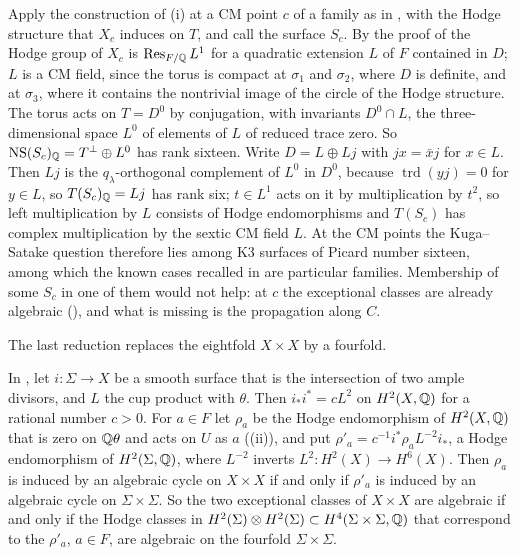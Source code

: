 \begin{remark}\label{rem:mumfordkscm}
Apply the construction of (i) at a CM point $c$ of a
family as in , with the Hodge structure that
$X_{c}$ induces on $T$, and call the surface $S_{c}$. By the proof of
 the Hodge group of $X_{c}$ is $\operatorname{Res}_{F/\mathbb{Q}}L^{1}$ for a
quadratic extension $L$ of $F$ contained in $D$; $L$ is a CM field, since the
torus is compact at $\sigma_{1}$ and $\sigma_{2}$, where $D$ is definite, and
at $\sigma_{3}$, where it contains the nontrivial image of the circle of the
Hodge structure. The torus acts on $T=D^{0}$ by conjugation, with invariants
$D^{0}\cap L$, the three-dimensional space $L^{0}$ of elements of $L$ of
reduced trace zero. So $\mathrm{NS}(S_{c})_{\mathbb{Q}}=T^{\perp}\oplus L^{0}$ has rank
sixteen. Write $D=L\oplus Lj$ with $jx=\bar{x}j$ for $x\in L$. Then $Lj$ is
the $q_{\lambda}$-orthogonal complement of $L^{0}$ in $D^{0}$, because
$\operatorname{trd}(yj)=0$ for $y\in L$, so $T(S_{c})_{\mathbb{Q}}=Lj$ has rank six;
$t\in L^{1}$ acts on it by multiplication by $t^{2}$, so left multiplication
by $L$ consists of Hodge endomorphisms and $T(S_{c})$ has complex
multiplication by the sextic CM field $L$. At the CM points the Kuga--Satake
question therefore lies among K3 surfaces of Picard number sixteen, among
which the known cases recalled in  are particular
families. Membership of some $S_{c}$ in one of them would not help: at $c$ the exceptional classes are already algebraic
(), and what is missing is the propagation along $C$.
\end{remark}

The last reduction replaces the eightfold $X\times X$ by a fourfold.

\begin{proposition}[A surface in $X$]\label{prop:mumfordsurface}
In , let $i\colon\Sigma\to X$ be a smooth surface that is
the intersection of two ample divisors, and $L$ the cup product with
$\theta$. Then $i_{*}i^{*}=cL^{2}$ on $H^{2}(X,\mathbb{Q})$ for a rational number
$c>0$. For $a\in F$ let $\rho_{a}$ be the Hodge endomorphism of
$H^{2}(X,\mathbb{Q})$ that is zero on $\mathbb{Q}\theta$ and acts on $U$ as $a$
((ii)), and put
$\rho'_{a}=c^{-1}i^{*}\rho_{a}L^{-2}i_{*}$, a Hodge endomorphism of
$H^{2}(\Sigma,\mathbb{Q})$, where $L^{-2}$ inverts $L^{2}\colon H^{2}(X)\to
H^{6}(X)$. Then $\rho_{a}$ is induced by an algebraic cycle on $X\times X$ if
and only if $\rho'_{a}$ is induced by an algebraic cycle on $\Sigma\times
\Sigma$. So the two exceptional classes of $X\times X$ are algebraic if and
only if the Hodge classes in $H^{2}(\Sigma)\otimes H^{2}(\Sigma)\subset
H^{4}(\Sigma\times\Sigma,\mathbb{Q})$ that correspond to the $\rho'_{a}$, $a\in F$,
are algebraic on the fourfold $\Sigma\times\Sigma$.
\end{proposition}

